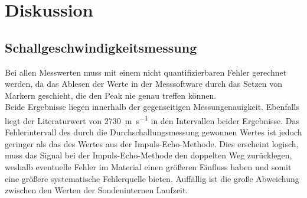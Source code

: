 \section{Diskussion}
\subsection{Schallgeschwindigkeitsmessung}
Bei allen Messwerten muss mit einem nicht quantifizierbaren Fehler gerechnet werden,
da das Ablesen der Werte in der Messsoftware durch das Setzen von Markern geschieht,
die den Peak nie genau treffen können.\\
Beide Ergebnisse liegen innerhalb der gegenseitigen Messungenauigkeit. Ebenfalls liegt
der Literaturwert von \SI[per-mode=reciprocal]{2730}{\metre\per\second} in den Intervallen
beider Ergebnisse. Das Fehlerintervall des durch die Durchschallungsmessung gewonnen Wertes
ist jedoch geringer als das des Wertes aus der Impuls-Echo-Methode. Dies erscheint logisch,
muss das Signal bei der Impuls-Echo-Methode den doppelten Weg zurücklegen, weshalb eventuelle
Fehler im Material einen größeren Einfluss haben und somit eine größere systematische
Fehlerquelle bieten. Auffällig ist die große Abweichung zwischen den Werten der Sondeninternen
Laufzeit.

\newpage
\nocite{*}
\printbibliography
